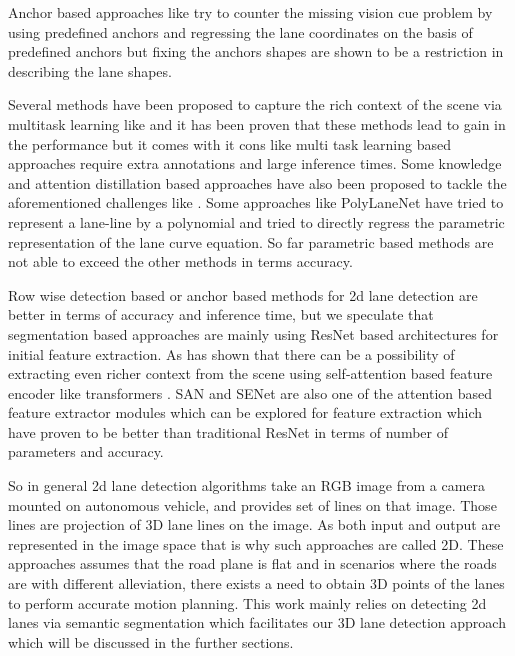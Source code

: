  Anchor based approaches like  \cite{https://doi.org/10.48550/arxiv.2010.12035} try to counter the missing vision cue problem by using predefined anchors and regressing the lane coordinates on the basis of predefined anchors but fixing the anchors shapes are shown to be a restriction in describing the lane shapes.

Several methods have been proposed to capture the rich context of the scene via multitask learning like \cite{inbook} and it has been proven that these methods lead to gain in the performance but it comes with it cons like multi task learning based approaches require extra annotations and large inference times. Some knowledge and attention distillation based approaches have also been proposed to tackle the aforementioned challenges like \cite{DBLP:journals/corr/abs-1908-00821}. Some approaches like PolyLaneNet\cite{DBLP:journals/corr/abs-2004-10924} have tried  to represent a lane-line by a polynomial and tried to directly regress the parametric representation of the lane curve equation. So far parametric based methods are not able to exceed the other methods in terms accuracy.

Row wise detection based or anchor based methods for 2d lane detection are better in terms of accuracy and inference time, but we speculate that segmentation based approaches are mainly using ResNet\cite{DBLP:journals/corr/HeZRS15} based architectures for initial feature extraction. As \cite{DBLP:journals/corr/abs-2105-05003} has shown that there can be a possibility of extracting even richer context from the scene using self-attention based feature encoder like transformers \cite{https://doi.org/10.48550/arxiv.1706.03762}.   SAN\cite{DBLP:journals/corr/abs-2004-13621} and SENet\cite{DBLP:journals/corr/abs-1709-01507} are also one of the attention based feature extractor modules which can be explored for feature extraction which have proven to be better than traditional ResNet\cite{DBLP:journals/corr/HeZRS15} in terms of number of parameters and accuracy. 

So in general 2d lane detection algorithms take an RGB image from a camera mounted on autonomous vehicle, and provides set of lines on that image. Those lines are projection of 3D lane lines on the image. As both input and output are represented in the image space that is why such approaches are called 2D. These approaches assumes that the road plane is flat and in scenarios where the roads are with different alleviation, there exists a need to obtain 3D points of the lanes to perform accurate motion planning. This work mainly relies on detecting 2d lanes via semantic segmentation which facilitates our 3D lane detection approach which will be discussed in the further sections. 
        
